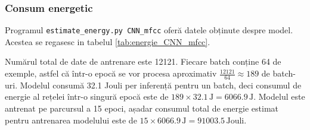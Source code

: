 \subsubsection{Consum energetic}

Programul \texttt{estimate\_energy.py CNN\_mfcc} oferă datele obținute despre model. Acestea se regasesc in tabelul \ref{tab:energie_CNN_mfcc}.

\begin{table}[htbp]
    \centering
    \caption{Consumul energetic al rețelei neurale convoluționale antrenată cu coeficienți cepstrali}
    \label{tab:energie_CNN_mfcc}
\end{table}

Numărul total de date de antrenare este 12121. Fiecare batch conține 64 de exemple, astfel că într-o epocă se vor procesa aproximativ \( \frac{12121}{64} \approx 189 \) de batch-uri. Modelul consumă 32.1 Jouli per inferență pentru un batch, deci consumul de energie al rețelei într-o singură epocă este de \( 189 \times 32.1 \, \text{J} = 6066.9 \, \text{J} \). Modelul este antrenat pe parcursul a 15 epoci, așadar consumul total de energie estimat pentru antrenarea modelului este de \( 15 \times 6066.9 \, \text{J} = 91003.5 \, \text{Jouli} \).


